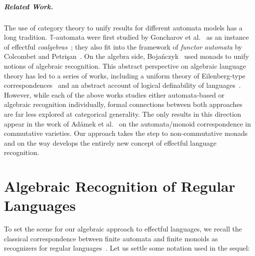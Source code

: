 \documentclass[a4paper, UKenglish, numberwithinsect, thm-restate, cleveref, final]{lipics-v2021}
\theoremstyle{plain}
\theoremstyle{definition}
\newcommand{\T}{\ensuremath{\mathbb{T}}\xspace}
\numberwithin{equation}{section}
\begin{document}
\subparagraph{Related Work.}  The use of category theory to unify results for different
automata models has a long tradition\cite{g72,am74,at89}. \T-automata were first studied by Goncharov et al.~\cite{gms14} as an instance of effectful \emph{coalgebras}~\cite{rutten00,sbbr13}; they also fit into the framework of \emph{functor automata} by Colcombet and Petri\c{s}an~\cite{cp19}.
On the algebra side, Boja{\'n}czyk~\cite{Bojan15} used monads to unify notions of algebraic recognition. This abstract perspective
on algebraic language theory has led to a series of works, including a uniform theory of Eilenberg-type
correspondences~\cite{uacm17} and an abstract account of logical definability of languages~\cite{blumensath21}. However, while each of the above works studies either automata-based or algebraic recognition individually, formal connections between both approaches are far less explored at categorical generality. The only
results in this direction appear in the work of Ad\'amek et al.~\cite{amu18} on the automata/monoid correspondence in commutative varieties. Our approach takes the step to non-commutative monads and on the way develops the entirely new concept of effectful language recognition.


\section{Algebraic Recognition of Regular Languages}
\label{sec:regular}
To set the scene for our algebraic approach to effectful languages, we recall the classical
correspondence between finite automata and finite monoids as recognizers for regular languages~\cite{pin15,rs59}. Let us settle some notation used in the sequel:
\end{document}
